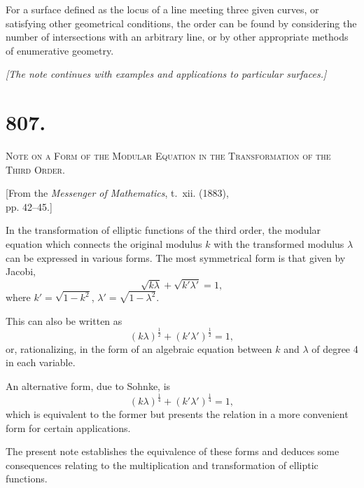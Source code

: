 \documentclass[11pt,a4paper]{book}
\begin{document}
For a surface defined as the locus of a line meeting three given curves, or satisfying other geometrical conditions, the order can be found by considering the number of intersections with an arbitrary line, or by other appropriate methods of enumerative geometry.

\vspace{0.5cm}
\noindent\textit{[The note continues with examples and applications to particular surfaces.]}
\vspace{0.5cm}



\newpage
\section*{807.}
\begin{center}
{\large\scshape Note on a Form of the Modular Equation in the Transformation of the Third Order.}
\end{center}

\begin{flushright}
\small[From the \textit{Messenger of Mathematics}, t.~xii. (1883),\\
pp. 42--45.]
\end{flushright}

In the transformation of elliptic functions of the third order, the modular equation which connects the original modulus $k$ with the transformed modulus $\lambda$ can be expressed in various forms. The most symmetrical form is that given by Jacobi,
\[
\sqrt{k\lambda} + \sqrt{k'\lambda'} = 1,
\]
where $k' = \sqrt{1 - k^2}$, $\lambda' = \sqrt{1 - \lambda^2}$.

This can also be written as
\[
(k\lambda)^{\frac{1}{2}} + (k'\lambda')^{\frac{1}{2}} = 1,
\]
or, rationalizing, in the form of an algebraic equation between $k$ and $\lambda$ of degree 4 in each variable.

An alternative form, due to Sohnke, is
\[
(k\lambda)^{\frac{1}{4}} + (k'\lambda')^{\frac{1}{4}} = 1,
\]
which is equivalent to the former but presents the relation in a more convenient form for certain applications.

The present note establishes the equivalence of these forms and deduces some consequences relating to the multiplication and transformation of elliptic functions.
\end{document}
